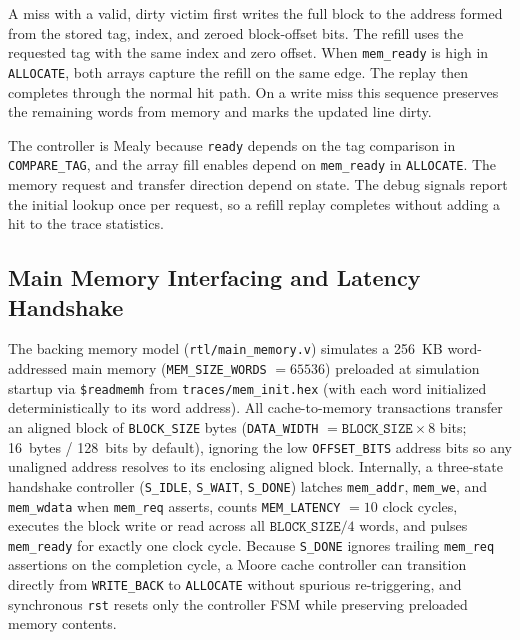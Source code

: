 \documentclass[conference]{IEEEtran}
\begin{document}
A miss with a valid, dirty victim first writes the full block to the address formed from the stored tag, index, and zeroed block-offset bits. The refill uses the requested tag with the same index and zero offset. When \texttt{mem\_ready} is high in \texttt{ALLOCATE}, both arrays capture the refill on the same edge. The replay then completes through the normal hit path. On a write miss this sequence preserves the remaining words from memory and marks the updated line dirty.

The controller is Mealy because \texttt{ready} depends on the tag comparison in \texttt{COMPARE\_TAG}, and the array fill enables depend on \texttt{mem\_ready} in \texttt{ALLOCATE}. The memory request and transfer direction depend on state. The debug signals report the initial lookup once per request, so a refill replay completes without adding a hit to the trace statistics.

\subsection{Main Memory Interfacing and Latency Handshake}
The backing memory model (\texttt{rtl/main\_memory.v}) simulates a 256~KB word-addressed main memory (\texttt{MEM\_SIZE\_WORDS} $= 65536$) preloaded at simulation startup via \texttt{\$readmemh} from \texttt{traces/mem\_init.hex} (with each word initialized deterministically to its word address). All cache-to-memory transactions transfer an aligned block of \texttt{BLOCK\_SIZE} bytes (\texttt{DATA\_WIDTH} $= \texttt{BLOCK\_SIZE} \times 8$ bits; 16~bytes / 128~bits by default), ignoring the low \texttt{OFFSET\_BITS} address bits so any unaligned address resolves to its enclosing aligned block. Internally, a three-state handshake controller (\texttt{S\_IDLE}, \texttt{S\_WAIT}, \texttt{S\_DONE}) latches \texttt{mem\_addr}, \texttt{mem\_we}, and \texttt{mem\_wdata} when \texttt{mem\_req} asserts, counts \texttt{MEM\_LATENCY} $= 10$ clock cycles, executes the block write or read across all $\texttt{BLOCK\_SIZE}/4$ words, and pulses \texttt{mem\_ready} for exactly one clock cycle. Because \texttt{S\_DONE} ignores trailing \texttt{mem\_req} assertions on the completion cycle, a Moore cache controller can transition directly from \texttt{WRITE\_BACK} to \texttt{ALLOCATE} without spurious re-triggering, and synchronous \texttt{rst} resets only the controller FSM while preserving preloaded memory contents.
\end{document}
